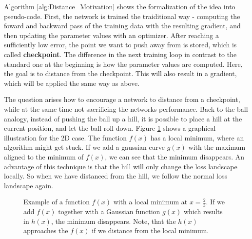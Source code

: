 Algorithm \ref{alg:Distance_Motivation} shows the formalization of the idea into
pseudo-code. First, the network is trained the traiditional way - computing the
foward and backward pass of the training data with the resulting gradient, and
then updating the parameter values with an optimizer. After reaching a
sufficiently low error, the point we want to push away from is stored, which is
called \textbf{checkpoint}. The difference in the next training loop in contrast
to the standard one at the beginning is how the parameter values are computed.
Here, the goal is to distance from the checkpoint. This will also result in a
gradient, which will be applied the same way as above.

The question arises how to encourage a network to distance from a checkpoint,
while at the same time not sacrificing the networks performance. Back to the
ball analogy, instead of pushing the ball up a hill, it is possible to place a
hill at the current position, and let the ball roll down. Figure
\ref{fig:Distance2D} shows a graphical illustration for the 2D case. The
function $f(x)$ has a local minimum, where an algorithm might get stuck. If we
add a gaussian curve $g(x)$ with the maximum aligned to the minimum of $f(x)$,
we can see that the minimum disappears. An advantage of this technique is that
the hill will only change the loss landscape locally. So when we have distanced
from the hill, we follow the normal loss landscape again.

\begin{figure}[h!]
    \begin{center}
        \caption{Example of a function $f(x)$ with a local minimum at $x=\frac{2}{3}$. If we add $f(x)$ together with a Gaussian function $g(x)$ which results in $h(x)$, the minimum disappears. Note, that the $h(x)$ approaches the $f(x)$ if we distance from the local minimum.}
        \label{fig:Distance2D}
    \end{center}
\end{figure}

